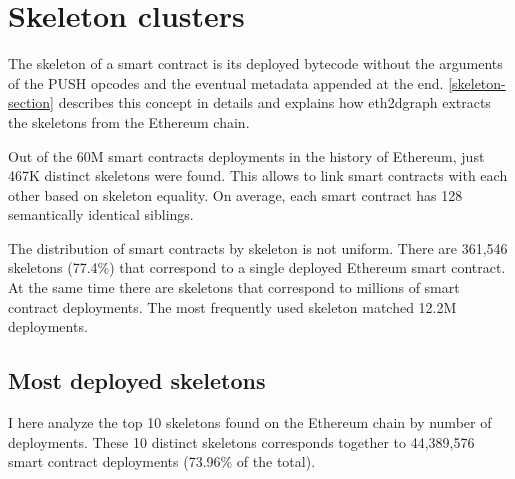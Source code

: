 \newpage

\section{Skeleton clusters}

The skeleton of a smart contract is its deployed bytecode without the arguments of the PUSH opcodes and the eventual metadata appended at the end. \cref{skeleton-section} describes this concept in details and explains how eth2dgraph extracts the skeletons from the Ethereum chain.

Out of the 60M smart contracts deployments in the history of Ethereum, just 467K distinct skeletons were found. This allows to link smart contracts with each other based on skeleton equality. On average, each smart contract has 128 semantically identical siblings. 

The distribution of smart contracts by skeleton is not uniform. There are 361,546 skeletons (77.4\%) that correspond to a single deployed Ethereum smart contract. At the same time there are skeletons that correspond to millions of smart contract deployments. The most frequently used skeleton matched 12.2M deployments.

\subsection{Most deployed skeletons}

I here analyze the top 10 skeletons found on the Ethereum chain by number of deployments. These 10 distinct skeletons corresponds together to 44,389,576 smart contract deployments (73.96\% of the total).

